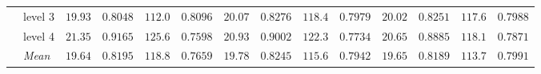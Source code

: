 \begin{table}[htbp]
\begin{tabular}{llrrrrrrrrrrrr}
 & level 3 & {\boldmath$19.93$} & {\boldmath$0.8048$} & {\boldmath$112.0$} & {\boldmath$0.8096$} & $20.07$ & $0.8276$ & $118.4$ & $0.7979$ & $20.02$ & $0.8251$ & $117.6$ & $0.7988$ \\
 & level 4 & $21.35$ & $0.9165$ & $125.6$ & $0.7598$ & $20.93$ & $0.9002$ & $122.3$ & $0.7734$ & {\boldmath$20.65$} & {\boldmath$0.8885$} & {\boldmath$118.1$} & {\boldmath$0.7871$} \\
 & \textit{Mean} & \colorbox{green!20}{\boldmath$19.64$} & $0.8195$ & $118.8$ & $0.7659$ & $19.78$ & $0.8245$ & $115.6$ & $0.7942$ & $19.65$ & \colorbox{green!20}{\boldmath$0.8189$} & \colorbox{green!20}{\boldmath$113.7$} & \colorbox{green!20}{\boldmath$0.7991$} \\
\bottomrule
\end{tabular}
\end{table}
